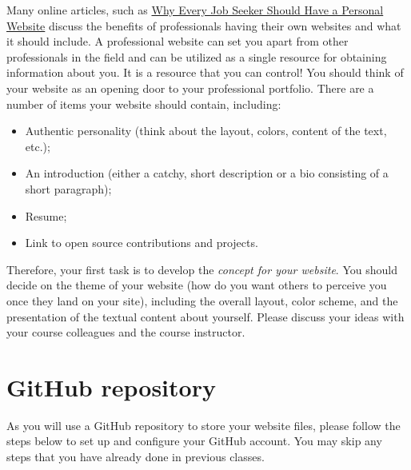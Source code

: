 \documentclass[11pt]{article}
\begin{document}
Many online articles, such as \href{https://www.forbes.com/sites/jacquelynsmith/2013/04/26/why-every-job-seeker-should-have-a-personal-website-and-what-it-should-include/#4a1aa6c3119e}{Why Every Job Seeker Should Have a Personal Website} discuss the benefits of  professionals having their own websites and what it should include. A professional website can set you apart from other professionals in the field and can be utilized as a single resource for obtaining information about you. It is a resource that you can control! You should think of your website as an opening door to your professional portfolio. There are a number of items your website should contain, including:
\vspace{-0.05in}
\begin{itemize}
	\item Authentic personality (think about the layout, colors, content of the text, etc.);
	\item An introduction (either a catchy, short description or a bio consisting of a short paragraph);
	\item Resume;
	\item Link to open source contributions and projects.
\end{itemize}
\vspace{-0.05in}

Therefore, your first task is to develop the \emph{concept for your website}. You should decide on the theme of your website (how do you want others to perceive you once they land on your site), including the overall layout, color scheme, and the presentation of the textual content about yourself. Please discuss your ideas with your course colleagues and the course instructor. 

\vspace{-0.05in}
\section*{GitHub repository}

As you will use a GitHub repository to store your website files, please follow the steps below to set up and configure your GitHub account. You may skip any steps that you have already done in previous classes.
\end{document}

